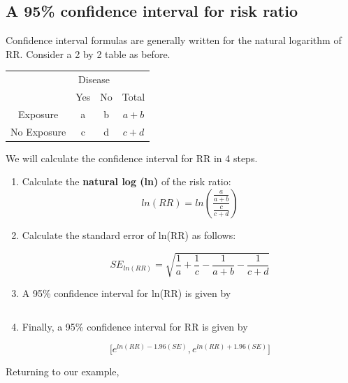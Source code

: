 \documentclass[11pt, chapterprefix=true]{scrbook}\usepackage[]{graphicx}\usepackage[]{color}
\begin{document}
\subsection{A 95\% confidence interval for risk ratio}

Confidence interval formulas are generally written for the natural logarithm of RR.  Consider a 2 by 2 table as before.

\begin{table}[ht]
\centering
\begin{tabular}{@{} cccc @{}} \hline
 & \multicolumn{2}{c}{Disease} \\
 & Yes & No & Total \\ \hline
 Exposure & a & b & $a + b$ \\
 No Exposure  & c & d & $c + d$ \\ \hline
 \end{tabular}
 \end{table}

We will calculate the confidence interval for RR in 4 steps.

\begin{enumerate}
\item Calculate the \textbf{natural log (ln)} of the risk ratio:
$$ ln(RR) = ln \left( \frac{ \frac{a}{a + b}}{ \frac{c}{c + d} } \right) $$

\item Calculate the standard error of ln(RR) as follows:

\begin{equation*}
   SE_{ln(RR)} = \sqrt{ \frac{1}{a} + \frac{1}{c} - \frac{1}{a + b} - \frac{1}{c + d}}
\end{equation*}

\item A 95\% confidence interval for ln(RR) is given by

\begin{equation*}
  [ ln(RR) - 1.96 (SE), ln(RR) + 1.96 (SE) ]
\end{equation*}

\item Finally, a 95\% confidence interval for RR is given by

\begin{equation*}
  \Big[ e^{ln(RR) - 1.96 (SE)}, e^{ln(RR) + 1.96 (SE)} \Big]
\end{equation*}

\end{enumerate}

Returning to our example,
\end{document}
